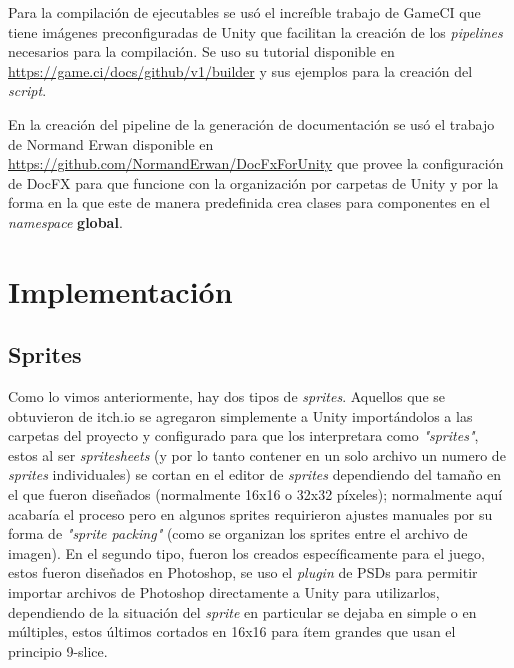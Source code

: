 Para la compilación de ejecutables se usó el increíble trabajo de GameCI que tiene imágenes preconfiguradas de Unity que facilitan la creación de los \textit{pipelines} necesarios para la compilación. Se uso su tutorial disponible en \url{https://game.ci/docs/github/v1/builder} y sus ejemplos para la creación del \textit{script}.

En la creación del pipeline de la generación de documentación se usó el trabajo de Normand Erwan disponible en \url{https://github.com/NormandErwan/DocFxForUnity} que provee la configuración de DocFX para que funcione con la organización por carpetas de Unity y por la forma en la que este de manera predefinida crea clases para componentes en el \textit{namespace} \textbf{global}.

\section{Implementación}
\subsection{Sprites}
Como lo vimos anteriormente, hay dos tipos de \textit{sprites}. Aquellos que se obtuvieron de itch.io se agregaron simplemente a Unity importándolos a las carpetas del proyecto y configurado para que los interpretara como \textit{"sprites"}, estos al ser \textit{spritesheets} (y por lo tanto contener en un solo archivo un numero de \textit{sprites} individuales) se cortan en el editor de \textit{sprites} dependiendo del tamaño en el que fueron diseñados (normalmente 16x16 o 32x32 píxeles); normalmente aquí acabaría el proceso pero en algunos sprites requirieron ajustes manuales por su forma de \textit{"sprite packing"} (como se organizan los sprites entre el archivo de imagen). En el segundo tipo, fueron los creados específicamente para el juego, estos fueron diseñados en Photoshop, se uso el \textit{plugin} de PSDs para permitir importar archivos de Photoshop directamente a Unity para utilizarlos, dependiendo de la situación del \textit{sprite} en particular se dejaba en simple o en múltiples, estos últimos cortados en  16x16 para ítem grandes que usan el principio 9-slice.

